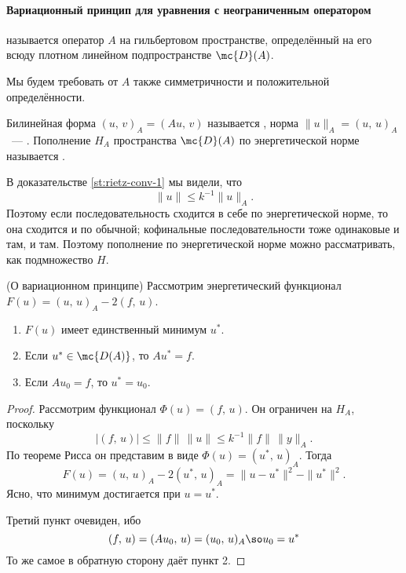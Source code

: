 \documentclass{trlnotes}
\begin{document}
    \paragraph{Вариационный принцип для уравнения с неограниченным оператором}

    \begin{de}
         называется оператор $A$ на гильбертовом пространстве, определённый на его всюду плотном линейном подпространстве $\mc{D}(A)$.
    \end{de}

    Мы будем требовать от $A$ также симметричности и положительной определённости.

    \begin{de}
        Билинейная форма $(u, \, v)_A = (Au, \, v)$ называется , норма $\|u\|_A = (u, \, u)_A$~--- . Пополнение $H_A$ пространства $\mc{D}(A)$ по энергетической норме называется . 
    \end{de}

    \begin{rem}
        В доказательстве \ref{st:rietz-conv-1} мы видели, что
        \[
            \|u\| \leqslant k^{-1} \|u\|_A.
        \]
        Поэтому если последовательность сходится в себе по энергетической норме, то она сходится и по обычной; кофинальные последовательности тоже одинаковые и там, и там. Поэтому пополнение по энергетической норме можно рассматривать, как подмножество $H$.
    \end{rem}

    \begin{thm}(О вариационном принципе)
        Рассмотрим энергетический функционал $F(u) = (u, \, u)_A - 2(f, \, u)$.
        \begin{enumerate}
            \item $F(u)$ имеет единственный минимум $u^*$.
            \item Если $u^* \in \mc{D(A)}$, то $Au^* = f$.
            \item Если $Au_0 = f$, то $u^* = u_0$.
        \end{enumerate}
        \begin{proof}
            Рассмотрим функционал $\Phi(u) = (f, \, u)$. Он ограничен на $H_A$, поскольку
            \[
                \big|(f, \, u)\big| \leqslant \|f\| \, \|u\| \leqslant k^{-1} \|f\| \, \|y\|_A.
            \]
            По теореме Рисса он представим в виде $\Phi(u) = (u^*, \, u)_A$.
            Тогда
            \[
                F(u) = (u, \, u)_A - 2(u^*, \, u)_A = \|u - u^*\|^2 - \|u^*\|^2.
            \]
            Ясно, что минимум достигается при $u = u^*$.

            Третий пункт очевиден, ибо
            \[
                (f, \, u) = (Au_0, \, u) = (u_0, \, u)_A \so u_0 = u^*
            \]
            То же самое в обратную сторону даёт пункт 2.
        \end{proof}
    \end{thm}
\end{document}
